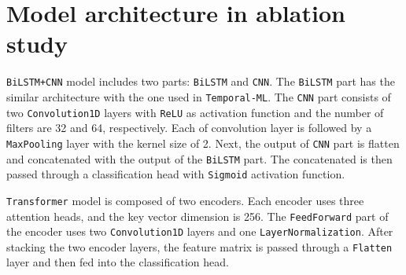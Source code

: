\documentclass[a4paper,fleqn]{cas-sc}
\begin{document}
\section{Model architecture in ablation study}
\label{app:ab_model}

\verb|BiLSTM+CNN| model includes two parts: \verb|BiLSTM| and \verb|CNN|. The \verb|BiLSTM| part has the similar architecture with the one used in \verb|Temporal-ML|. The \verb|CNN| part consists of two \verb|Convolution1D| layers with \verb|ReLU| as activation function and the number of filters are 32 and 64, respectively. Each of convolution layer is followed by a \verb|MaxPooling| layer with the kernel size of 2. Next, the output of \verb|CNN| part is flatten and concatenated with the output of the \verb|BiLSTM| part. The concatenated is then passed through a classification head with \verb|Sigmoid| activation function.

\vspace{1mm}

\verb|Transformer| model is composed of two encoders. Each encoder uses three attention heads, and the key vector dimension is 256. The \verb|FeedForward| part of the encoder uses two \verb|Convolution1D| layers and one \verb|LayerNormalization|. After stacking the two encoder layers, the feature matrix is passed through a \verb|Flatten| layer and then fed into the classification head.

\printcredits


%



\end{document}
